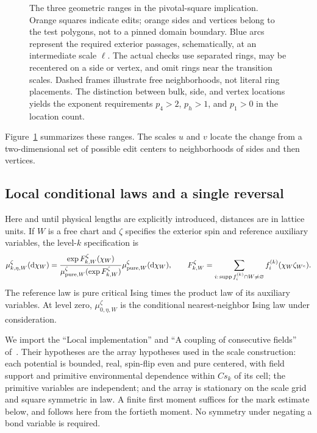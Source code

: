 \begin{figure}[tb]
 \centering
 
 \caption{The three geometric ranges in the pivotal-square implication.
 Orange squares indicate edits; orange sides and vertices belong to
 the test polygons, not to a pinned domain boundary.  Blue arcs represent
 the required exterior passages, schematically, at an intermediate
 scale $\ell$.  The actual checks use separated rings, may be recentered
 on a side or vertex, and omit rings near the transition scales.
 Dashed frames illustrate free neighborhoods, not literal ring placements.
 The distinction between bulk, side, and vertex locations yields the
 exponent requirements $p_4>2$, $p_h>1$, and $p_1>0$ in the location count.}
 \label{fig:pivotal-ranges}
\end{figure}
Figure~\ref{fig:pivotal-ranges} summarizes these ranges.  The scales
$u$ and $v$ locate the change from a two-dimensional set of possible
edit centers to neighborhoods of sides and then vertices.

\subsection{Local conditional laws and a single reversal}

Here and until physical lengths are explicitly introduced, distances
are in lattice units.  If $W$ is a free chart and $\zeta$ specifies the
exterior spin and reference auxiliary variables, the level-$k$
specification is
\begin{equation}
 \mu_{k,\eta,W}^{\zeta}(\mathrm d\chi_W)
 =\frac{\exp F_{k,W}^{\zeta}(\chi_W)}
 {\mu_{{\rm pure},W}^{\zeta}(\exp F_{k,W}^{\zeta})}
 \mu_{{\rm pure},W}^{\zeta}(\mathrm d\chi_W),
 \qquad
 F_{k,W}^{\zeta}=\sum_{i:\,\operatorname{supp} f_i^{(k)}\cap W\ne\varnothing}
 f_i^{(k)}(\chi_W\zeta_{W^c}).
 \label{eq:crossing-specification}
\end{equation}
The reference law is pure critical Ising times the product law of its
auxiliary variables.  At level zero, $\mu_{0,\eta,W}^{\zeta}$ is the
conditional nearest-neighbor Ising law under consideration.

We import the ``Local implementation'' and ``A coupling of consecutive
fields'' of~\cite[Section~3]{R}.  Their hypotheses are the array
hypotheses used in the scale construction: each potential is bounded,
real, spin-flip even and pure centered, with field support and primitive
environmental dependence within $Cs_k$ of its cell; the primitive
variables are independent; and the array is stationary on the scale
grid and square symmetric in law.  A finite first moment suffices for
the mark estimate below, and follows here from the fortieth moment.
No symmetry under negating a bond variable is required.

